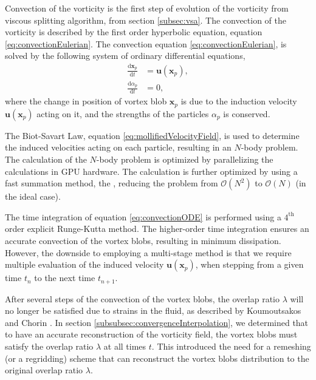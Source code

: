Convection of the vorticity is the first step of evolution of the vorticity from viscous splitting algorithm, from section \ref{subsec:vsa}. The convection of the vorticity is described by the first order hyperbolic equation, equation \ref{eq:convectionEulerian}. The convection equation \ref{eq:convectionEulerian}, is solved by the following system of ordinary differential equations,
	\begin{subequations}
	\begin{align}
	\frac{\mathrm{d}\mathbf{x}_p}{\mathrm{d}t} &= \mathbf{u}\left(\mathbf{x}_p\right),\\
	\frac{\mathrm{d}\alpha_p}{\mathrm{d}t} &= 0,
	\end{align}
	\label{eq:convectionODE}
	\end{subequations}
where the change in position of vortex blob $\mathbf{x}_p$ is due to the induction velocity $\mathbf{u}\left(\mathbf{x}_p\right)$ acting on it, and the strengths of the particles $\alpha_p$ is conserved.

The Biot-Savart Law, equation \ref{eq:mollifiedVelocityField}, is used to determine the induced velocities acting on each particle, resulting in an $N$-body problem. The calculation of the $N$-body problem is optimized by parallelizing the calculations in GPU hardware. The calculation is further optimized by using a fast summation method, the , reducing the problem from $\mathcal{O}(N^2)$ to $\mathcal{O}(N)$ (in the ideal case).

The time integration of equation \ref{eq:convectionODE} is performed using a $4^{\mathrm{th}}$ order explicit Runge-Kutta method. The higher-order time integration ensures an accurate convection of the vortex blobs, resulting in minimum dissipation. However, the downside to employing a multi-stage method is that we require multiple evaluation of the induced velocity $\mathbf{u}\left(\mathbf{x}_p\right)$, when stepping from a given time $t_n$ to the next time $t_{n+1}$.

After several steps of the convection of the vortex blobs, the overlap ratio $\lambda$ will no longer be satisfied due to strains in the fluid, as described by Koumoutsakos and Chorin \cite{Cottet2000a}. In section \ref{subsubsec:convergenceInterpolation}, we determined that to have an accurate reconstruction of the vorticity field, the vortex blobs must satisfy the overlap ratio $\lambda$ at all times $t$. This introduced the need for a remeshing (or a regridding) scheme that can reconstruct the vortex blobs distribution to the original overlap ratio $\lambda$.

